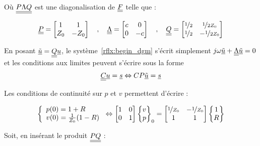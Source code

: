 Où $\underline{\underline{P\Lambda Q}}$ est une diagonalisation de $\underline{\underline{F}}$ telle que :

\[
\underline{\underline{P}} = \begin{bmatrix}1 & 1\\Z_0 & -Z_0\end{bmatrix} \quad,\quad
\underline{\underline{\Lambda}} = \begin{bmatrix}c & 0\\0 & -c\end{bmatrix} \quad,\quad
\underline{\underline{Q}} = \begin{bmatrix}
	\nicefrac{1}{2} & \nicefrac{1}{2Z_0}\\
	\nicefrac{1}{2} & -\nicefrac{1}{2Z_0}\\
\end{bmatrix}
\]

En posant $\underline{\tilde{u}} = \underline{\underline{Q}}\underline{u}$, le système~\eqref{rflx:begin_dgm} s'écrit simplement $j\omega\underline{\tilde{u}} +
\underline{\underline{\Lambda}}\underline{\tilde{u}} = 0$ et les conditions aux limites peuvent s'écrire sous la forme $$\underline{\underline{C}}\underline{u} = \underline{s} \Leftrightarrow
CP\underline{\tilde{u}} = \underline{s}$$

Les conditions de continuité sur $p$ et $v$ permettent d'écrire :

\begin{equation*}
	\left\{
		\begin{array}{l}
			p(0) = 1 + R\\
			v(0) = \frac{1}{Z_0}(1-R)
		\end{array}
	\right.
	\Leftrightarrow
	\begin{bmatrix}
		1 & 0\\
		0 & 1
	\end{bmatrix}
	\begin{Bmatrix}
		v\\
		p
	\end{Bmatrix}_0 = 
	\begin{bmatrix}
		\nicefrac{1}{Z_0} & -\nicefrac{1}{Z_0}\\
		1 & 1
	\end{bmatrix}
	\begin{Bmatrix}
		1\\
		R
	\end{Bmatrix}
\end{equation*}

Soit, en insérant le produit $\underline{\underline{PQ}}$ :

